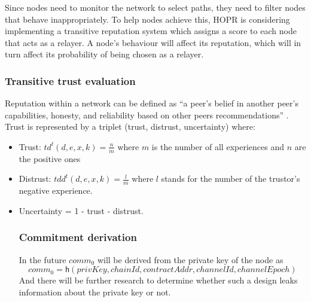 Since nodes need to monitor the network to select paths, they need to filter
nodes that behave inappropriately. To help nodes achieve this, HOPR is considering implementing a
transitive reputation system which assigns a score to each node that acts as a
relayer. A node’s behaviour will affect its reputation, which will in turn affect its probability of
being chosen as a relayer.

\subsubsection*{Transitive trust evaluation }

Reputation within a network can be defined as ``a peer’s belief in another peer’s
capabilities, honesty, and reliability based on other peers recommendations” \cite{Wang_2003}.
Trust is represented by a triplet (trust, distrust, uncertainty) where:

\begin{itemize}

    \item Trust: $td^t(d,e,x,k)=\frac{n}{m}$ where $m$ is the number of all
        experiences and $n$ are the positive ones

    \item Distrust: $tdd^t(d,e,x,k)=\frac{l}{m}$ where $l$ stands for the number
        of the trustor’s negative experience.

    \item Uncertainty = 1 - trust - distrust.
 
 \subsubsection*{Commitment derivation}
  In the future $comm_0$ will be derived from the private key of the node as $$ comm_0 = \mathsf{h}(privKey,chainId,
contractAddr, channelId, channelEpoch)$$
And there will be further research to determine whether such a design leaks information about the
private key or not. 

\end{itemize}
